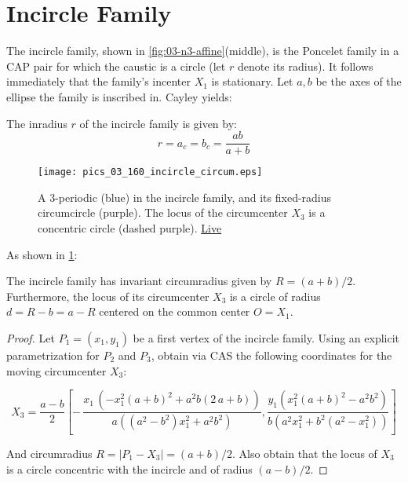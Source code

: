   
\section{Incircle Family}
The incircle family, shown in \cref{fig:03-n3-affine}(middle), is the Poncelet family in a CAP pair for which the caustic is a circle (let $r$ denote its radius). It follows immediately that the family's incenter $X_1$ is stationary. Let $a,b$ be the axes of the ellipse the family is inscribed in. Cayley yields:

\begin{proposition}
The inradius $r$ of the incircle family is given by: 
\[ r=a_c=b_c=\frac{a b}{a+b} \]
\label{prop:03-incircle}
\end{proposition} 

\begin{figure}
    \centering
    \texttt{[image: pics\_03\_160\_incircle\_circum.eps]}
    \caption{A 3-periodic (blue) in the incircle family, and its fixed-radius circumcircle (purple). The locus of the circumcenter $X_3$ is a concentric circle (dashed purple). \href{https://bit.ly/3thddWK}{Live}}
    \label{fig:03-incircle-circum}
\end{figure}

As shown in \cref{fig:03-incircle-circum}:

\begin{proposition}
The incircle family has invariant circumradius given by $R=(a+b)/2$. Furthermore, the locus of its circumcenter $X_3$ is a circle of radius $d=R-b=a-R$ centered on the common center $O=X_1$.
\label{prop:03-n3-incircle-R}
\end{proposition}

\begin{proof}
Let $P_1=(x_1,y_1)$ be a first vertex of the incircle family. Using an explicit parametrization for $P_2$ and $P_3$, obtain via CAS the following coordinates for the moving circumcenter $X_3$:

{\scriptsize
\[
X_3=\frac{a-b}{2}\left[ - \,{\frac {x_1\, \left( -x_1^{2}
			\left( a+b \right) ^{2}+{a}^{2} b \left( 2\,a+b \right)  \right) }{ a
			\left(  \left( {a}^{2}-{b}^{2} \right) x_1^{2}+{a}^{2}{b}^{2}
			\right) }}
	 ,  {\frac { y_1\left( x_1^{2} \left( a+b
	 		\right) ^{2}-{a}^{2}{b}^{2} \right)}{b \left( {a}^{2}x_1^2+{b}^{2} \left( {a}^{2}-x_1^{2} \right)  \right) }}
	   \right]
 \]
 }

And circumradius $R=|P_1-X_3|=(a+b)/2$. Also obtain that the locus of $X_3$ is a circle concentric with the incircle and of radius $(a-b)/2$.
\end{proof}

